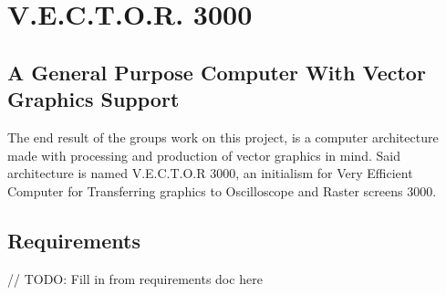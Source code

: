 \chapter{V.E.C.T.O.R. 3000}

\section{A General Purpose Computer With Vector Graphics Support}

The end result of the groups work on this project, is a computer architecture made with processing and production of vector graphics in mind.
Said architecture is named V.E.C.T.O.R 3000, an initialism for Very Efficient Computer for Transferring graphics to Oscilloscope and Raster screens 3000.

\section{Requirements}

// TODO: Fill in from requirements doc here
